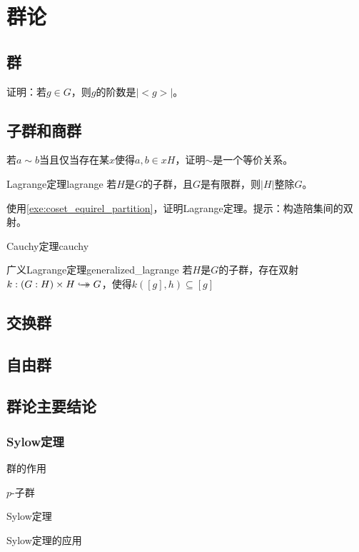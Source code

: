 \documentclass[../main.tex]{subfiles}
\begin{document}
\chapter{群论}
\section{群}
\begin{exercise}\label{exe:order_and_cyclic_subgroup}
证明：若$g\in G$，则$g$的阶数是$|<g>|$。
\end{exercise}
\section{子群和商群}
\begin{exercise}\label{exe:coset_equirel_partition}
若$a\sim b$当且仅当存在某$x$使得$a,b\in xH$，证明$\sim$是一个等价关系。
\end{exercise}
\begin{proposition}{Lagrange定理}{lagrange}
若$H$是$G$的子群，且$G$是有限群，则$|H|$整除$G$。
\end{proposition}
\begin{exercise}
使用\ref{exe:coset_equirel_partition}，证明Lagrange定理。提示：构造陪集间的双射。
\end{exercise}
\begin{proposition}{Cauchy定理}{cauchy}

\end{proposition}
\begin{theorem}{广义Lagrange定理}{generalized_lagrange}
若$H$是$G$的子群，存在双射$k:(G:H)\times H\hookrightarrow\mathrel{\mspace{-15mu}}\rightarrow G$，使得$k([g],h)\subseteq[g]$
\end{theorem}
\section{交换群}
\section{自由群}
\section{群论主要结论}
\subsection{Sylow定理}
\begin{introduction}
\item 群的作用
\item $p$-子群
\item Sylow定理
\item Sylow定理的应用
\end{introduction}
\end{document}
